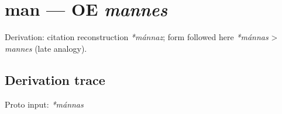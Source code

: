 \documentclass[
  british,
  a4paper,
  openany]{book}
\providecommand{\texorpdfstring}[2]{#1}
\begin{document}
\section{\texorpdfstring{man --- OE
\emph{mannes}}{man --- OE mannes}}\label{man-oe-mannes}


Derivation: citation reconstruction \emph{*mánnaz}; form followed here
\emph{*mánnas} \textgreater{} \emph{mannes} (late analogy).

\subsection{Derivation trace}\label{derivation-trace-118}

Proto input: \emph{*mánnas}

\begingroup
\setlength{\fboxsep}{6pt}
\end{document}
